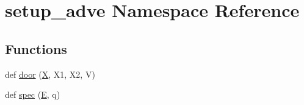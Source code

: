 \hypertarget{namespacesetup__adve}{}\section{setup\+\_\+adve Namespace Reference}
\label{namespacesetup__adve}
\subsection*{Functions}
\begin{DoxyCompactItemize}
\item 
def \hyperlink{namespacesetup__adve_a7780f17fc73f295cd92ee29dcfddc318}{door} (\hyperlink{namespacesetup__adve_ac58005e2708a29ed334e0542dd68d336}{X}, X1, X2, V)
\item 
def \hyperlink{namespacesetup__adve_a06d5e69febd8c6f846b62eea7e0bb866}{spec} (\hyperlink{namespacesetup__adve_a924af0e190ae028ed71b0d7b9dd75fed}{E}, q)
\end{DoxyCompactItemize}
